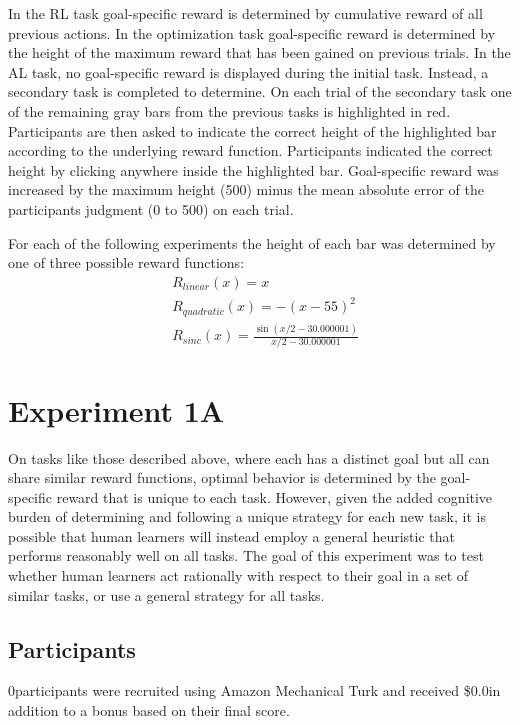 \documentclass[10pt,letterpaper]{article}
\def\maxheight{500}
\def\basepay{\$0.0}
\def\numpartA{0}
\begin{document}
	In the RL task goal-specific reward is determined by cumulative reward of all previous actions. In the optimization task goal-specific reward is determined by the height of the maximum reward that has been gained on previous trials. In the AL task, no goal-specific reward is displayed during the initial task. Instead, a secondary task is completed to determine. On each trial of the secondary task one of the remaining gray bars from the previous tasks is highlighted in red. Participants are then asked to indicate the correct height of the highlighted bar according to the underlying reward function. Participants indicated the correct height by clicking anywhere inside the highlighted bar. Goal-specific reward was increased by the maximum height (\maxheight) minus the mean absolute error of the participants judgment (0 to \maxheight) on each trial.
	
	For each of the following experiments the height of each bar was determined by one of three possible reward functions:
	\begin{equation}
	\begin{split}
	&R_{linear}(x) = x \\
	&R_{quadratic}(x) = -(x-55)^{2} \\
	&R_{sinc}(x) = \frac{\sin(x/2-30.000001)}{x/2-30.000001}
	\end{split}
	\end{equation}
	
	\section{Experiment 1A}
	
	On tasks like those described above, where each has a distinct goal but all can share similar reward functions, optimal behavior is determined by the goal-specific reward that is unique to each task. However, given the added cognitive burden of determining and following a unique strategy for each new task, it is possible that human learners will instead employ a general heuristic that performs reasonably well on all tasks. The goal of this experiment was to test whether human learners act rationally with respect to their goal in a set of similar tasks, or use a general strategy for all tasks.
	
	\subsection{Participants}
	
	\numpartA \space participants were recruited using Amazon Mechanical Turk and received \basepay \space in addition to a bonus based on their final score.
	
\end{document}
